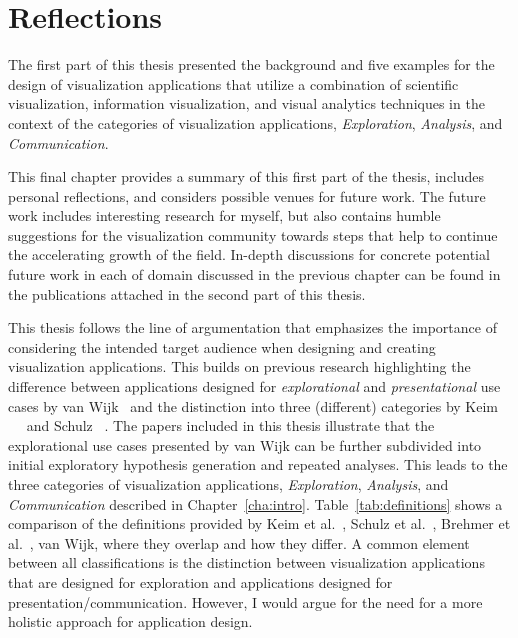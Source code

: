 \chapter{Reflections} \label{cha:reflections}
The first part of this thesis presented the background and five examples for the design of visualization applications that utilize a combination of scientific visualization, information visualization, and visual analytics techniques in the context of the categories of visualization applications, \emph{Exploration}, \emph{Analysis}, and \emph{Communication}.

This final chapter provides a summary of this first part of the thesis, includes personal reflections, and considers possible venues for future work.  The future work includes interesting research for myself, but also contains humble suggestions for the visualization community towards steps that help to continue the accelerating growth of the field.  In-depth discussions for concrete potential future work in each of domain discussed in the previous chapter can be found in the publications attached in the second part of this thesis.

This thesis follows the line of argumentation that emphasizes the importance of considering the intended target audience when designing and creating visualization applications.  This builds on previous research highlighting the difference between applications designed for \emph{explorational} and \emph{presentational} use cases by van Wijk~\cite{van2005value} and the distinction into three (different) categories by Keim \etal\ ~\cite{keim2006challenges} and Schulz \etal ~\cite{schulz2013design}.  The papers included in this thesis illustrate that the explorational use cases presented by van Wijk can be further subdivided into initial exploratory hypothesis generation and repeated analyses.  This leads to the three categories of visualization applications, \emph{Exploration}, \emph{Analysis}, and \emph{Communication} described in Chapter~\ref{cha:intro}. Table~\ref{tab:definitions} shows a comparison of the definitions provided by Keim et al.~\cite{keim2006challenges}, Schulz et al.~\cite{schulz2013design}, Brehmer et al.~\cite{brehmer2013typology}, van Wijk, where they overlap and how they differ.  A common element between all classifications is the distinction between visualization applications that are designed for exploration and applications designed for presentation/communication.  However, I would argue for the need for a more holistic approach for application design.

